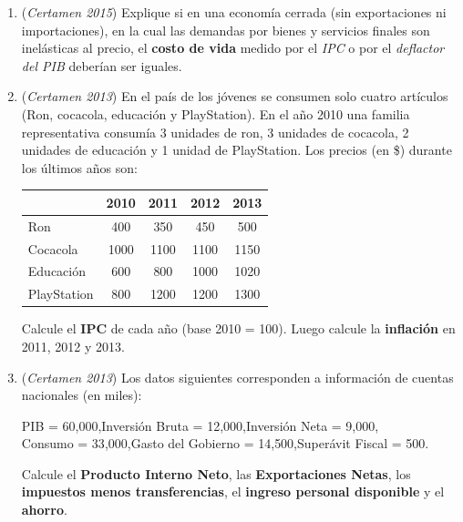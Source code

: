 \documentclass[11pt,addpoints]{article}
\begin{document}
\begin{enumerate}
\item (\textit{Certamen 2015}) Explique si en una economía cerrada (sin exportaciones ni importaciones), en la cual las demandas por bienes y servicios finales son inelásticas al precio, el \textbf{costo de vida} medido por el \textit{IPC} o por el \textit{deflactor del PIB} deberían ser iguales.


\item (\textit{Certamen 2013}) En el país de los jóvenes se consumen solo cuatro artículos (Ron, cocacola, educación y PlayStation). En el año 2010 una familia representativa consumía 3 unidades de ron, 3 unidades de cocacola, 2 unidades de educación y 1 unidad de PlayStation. Los precios (en \$) durante los últimos años son:

\begin{center}
\begin{tabular}{lcccc}
\hline
 & 2010 & 2011 & 2012 & 2013 \\
\hline
Ron & 400 & 350 & 450 & 500 \\
Cocacola & 1000 & 1100 & 1100 & 1150 \\
Educación & 600 & 800 & 1000 & 1020 \\
PlayStation & 800 & 1200 & 1200 & 1300 \\
\hline
\end{tabular}
\end{center}
\medskip
\noindent %
Calcule el \textbf{IPC} de cada año (base 2010 = 100). Luego calcule la \textbf{inflación} en 2011, 2012 y 2013.


\newpage %
\vspace*{0.1cm} %

\item (\textit{Certamen 2013}) Los datos siguientes corresponden a información de cuentas nacionales (en miles):
\begin{center}
PIB = 60{,}000,\quad Inversión Bruta = 12{,}000,\quad Inversión Neta = 9{,}000,\quad\\
Consumo = 33{,}000,\quad Gasto del Gobierno = 14{,}500,\quad Superávit Fiscal = 500.
\end{center}
Calcule el \textbf{Producto Interno Neto}, las \textbf{Exportaciones Netas}, los \textbf{impuestos menos transferencias}, el \textbf{ingreso personal disponible} y el \textbf{ahorro}.
\end{enumerate}


\newpage %
\vspace*{0.1cm} %
\end{document}

